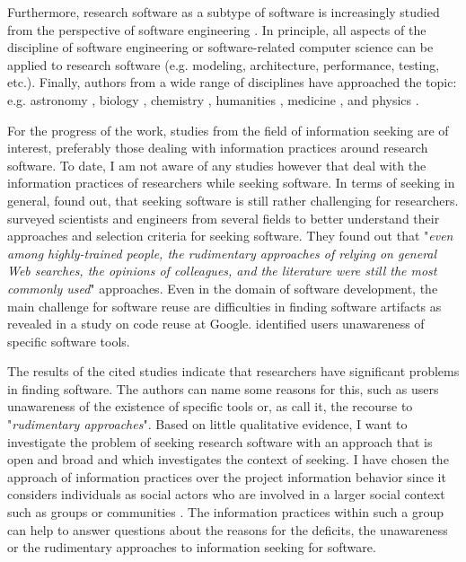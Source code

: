 \documentclass[12pt, a4paper, titlepage, oneside, abstract=true, toc=listof, toc=bibliography]{scrreprt}
\begin{document}
Furthermore, research software as a subtype of software is increasingly studied from the perspective of software engineering \citep[e.g.][]{Johanson2018, Hasselbring2019a, Hasselbring2020, Kanewala2018, Zirkelbach2020}. In principle, all aspects of the discipline of software engineering or software-related computer science can be applied to research software (e.g. modeling, architecture, performance, testing, etc.).
Finally, authors from a wide range of disciplines have approached the topic: e.g.
astronomy \citep{Allen2019, Borne2009, Gray2011, Grosbol2010, Muna2016, Oishi2018, Shortridge2009, Weiner2009}, 
biology \citep{Lee2018, Mangul2019, Markowetz2017, Waltemath2016},
chemistry \citep{AlvarezMoreno2014, Dryden2017, Goh2017, Grimme2017},
humanities \citep{Anthony2013, Brian2020, Edmond2017, Heyer2019, Wolski2017},
medicine \citep{Kislinskiy2016, White2019, Ye2019},
and physics \citep{Bobra2020, Shamir2013, Zwart2018}.

For the progress of the work, studies from the field of information seeking are of interest, preferably those dealing with information practices around research software.
To date, I am not aware of any studies however that deal with the information practices of researchers while seeking software. In terms of seeking in general, \citet{Howison2015} found out, that seeking software is still rather challenging for researchers. \citet{Hucka2018} surveyed scientists and engineers from several fields to better understand their approaches and selection criteria for seeking software. They found out that "\textit{even among highly-trained people, the
rudimentary approaches of relying on general Web searches, the opinions of colleagues, and the literature were still the most commonly used}" approaches. Even in the domain of software development, the main challenge for software reuse are difficulties in finding software artifacts as \citet{Bauer2014} revealed in a study on code reuse at Google. \citet{Grossman2009} identified users unawareness of specific software tools. 

The results of the cited studies indicate that researchers have significant problems in finding software. The authors can name some reasons for this, such as users unawareness of the existence of specific tools or, as \citep[p. 171]{Hucka2018} call it, the recourse to "\textit{rudimentary approaches}". Based on little qualitative evidence, I want to investigate the problem of seeking research software with an approach that is open and broad and which investigates the context of seeking. I have chosen the approach of information practices over the project information behavior since it considers individuals as social actors who are involved in a larger social context such as groups or communities \citep[p. 120]{Savolainen2007}. The information practices within such a group can help to answer questions about the reasons for the deficits, the unawareness or the rudimentary approaches to information seeking for software. 
\end{document}
